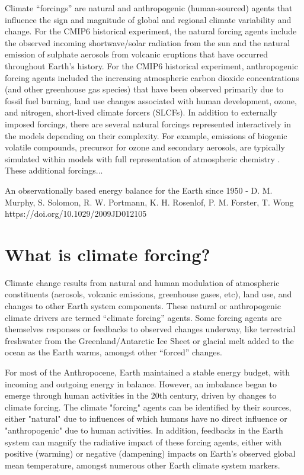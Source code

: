\documentclass[gmd, preprint]{copernicus}
\newcommand{\mycomment}[1]{}
\begin{document}


\mycomment{Details about CMIP5 forcings can be found in https://pcmdi.llnl.gov/mips/cmip5/docs/Experiment_design_addendum.pdf}


\introduction  %
Climate “forcings” are natural and anthropogenic (human-sourced) agents that influence the sign and magnitude of global and regional climate variability and change. For the CMIP6 historical experiment, the natural forcing agents include the observed incoming shortwave/solar radiation from the sun and the natural emission of sulphate aerosols from volcanic eruptions that have occurred throughout Earth’s history. For the CMIP6 historical experiment, anthropogenic forcing agents included the increasing atmospheric carbon dioxide concentrations (and other greenhouse gas species) that have been observed primarily due to fossil fuel burning, land use changes associated with human development, ozone, and nitrogen, short-lived climate forcers (SLCFs). In addition to externally imposed forcings, there are several natural forcings represented interactively in the models depending on their complexity. For example, emissions of biogenic volatile compounds, precursor for ozone and secondary aerosols, are typically simulated within models with full representation of atmospheric chemistry \citep{thornhill_climate-driven_2021,young_pre-industrial_2013}. These additional forcings...


An observationally based energy balance for the Earth since 1950 - D. M. Murphy, S. Solomon, R. W. Portmann, K. H. Rosenlof, P. M. Forster, T. Wong https://doi.org/10.1029/2009JD012105


\section{What is climate forcing?}
Climate change results from natural and human modulation of atmospheric constituents (aerosols, volcanic emissions, greenhouse gases, etc), land use, and changes to other Earth system components. These natural or anthropogenic climate drivers are termed “climate forcing” agents. Some forcing agents are themselves responses or feedbacks to observed changes underway, like terrestrial freshwater from the Greenland/Antarctic Ice Sheet or glacial melt added to the ocean as the Earth warms, amongst other “forced” changes.

For most of the Anthropocene, Earth maintained a stable energy budget, with incoming and outgoing energy in balance. However, an imbalance began to emerge through human activities in the 20th century, driven by changes to climate forcing. The climate "forcing" agents can be identified by their sources, either "natural" due to influences of which humans have no direct influence or "anthropogenic" due to human activities. In addition, feedbacks in the Earth system can magnify the radiative impact of these forcing agents, either with positive (warming) or negative (dampening) impacts on Earth's observed global mean temperature, amongst numerous other Earth climate system markers.
\end{document}
